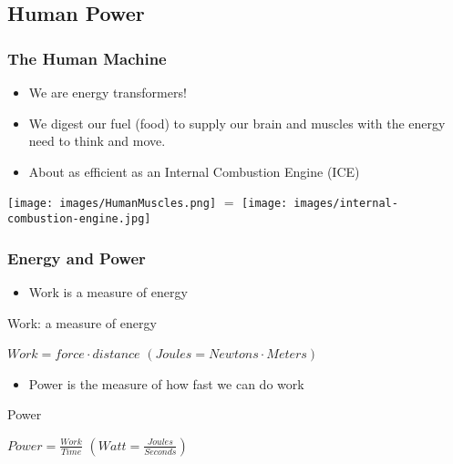 \documentclass[]{beamer}
\begin{document}
\subsection{Human Power}
%
\frame
{
    \frametitle{The Human Machine}
    \begin{itemize}
        \item<1-> We are energy transformers!
        \item<2-> We digest our fuel (food) to supply our brain and muscles
            with the energy need to think and move.
        \item<3-> About as efficient as an Internal Combustion Engine (ICE)
    \end{itemize}
    \begin{center}
        \texttt{[image: images/HumanMuscles.png]}
        \Large{$=$}
        \texttt{[image: images/internal-combustion-engine.jpg]}
    \end{center}
}
%
\frame
{
    \frametitle{Energy and Power}
    \begin{itemize}
        \item<1-> Work is a measure of energy
    \end{itemize}
  \begin{beamerboxesrounded}[upper=uppercol,lower=lowercol,shadow=true]{Work:
        a measure of energy}
    \begin{center}
            $Work = force \cdot distance$ $(Joules=Newtons\cdot Meters)$ 
    \end{center}
  \end{beamerboxesrounded}
    \begin{itemize}
        \item<2-> Power is the measure of how fast we can do work
    \end{itemize}
  \begin{beamerboxesrounded}[upper=uppercol,lower=lowercol,shadow=true]{Power}
    \begin{center}
            $Power=\frac{Work}{Time}$ $(Watt = \frac{Joules}{Seconds})$
        \end{center}
  \end{beamerboxesrounded}
}
\end{document}
